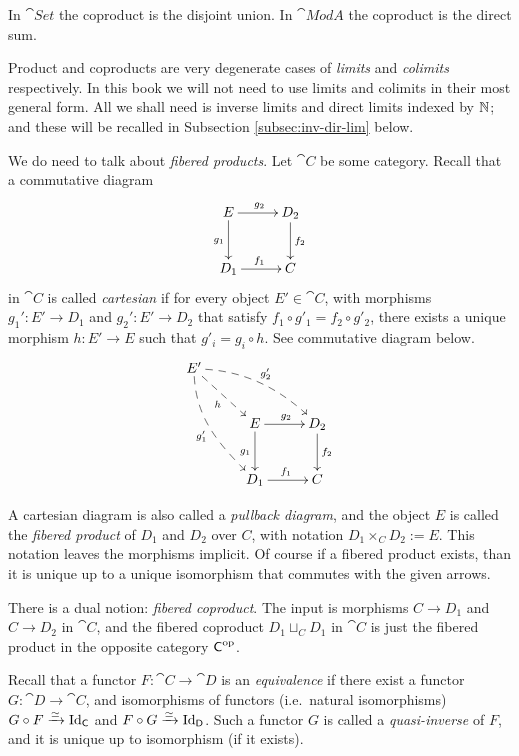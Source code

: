 \begin{exa} \label{exa:103}
In $\cat{Set}$ the coproduct is the disjoint union. 
In $\cat{Mod} A$ the coproduct is the direct sum. 
\end{exa}

Product and coproducts are very degenerate cases of {\em limits} and {\em 
colimits} respectively. In this book we will not need to use limits and 
colimits in their most general form. All we shall need is inverse limits and 
direct limits indexed by $\mathbb{N}$; and these will be recalled in Subsection 
\ref{subsec:inv-dir-lim} below. 

We do need to talk about {\em fibered products}. Let $\cat{C}$ be some 
category. Recall that a commutative diagram 
\begin{equation} \label{eqn:3625}
\UseTips \xymatrix @C=6ex @R=6ex {
E
\ar[d]_{g_1}
\ar[r]^{g_2}
&
D_2
\ar[d]^{f_2}
\\
D_1
\ar[r]^{f_1}
&
C
}
\end{equation}
in $\cat{C}$ is called {\em cartesian} if for every object $E' \in \cat{C}$, 
with morphisms 
$g_1' : E' \to D_1$ and $g_2' : E' \to D_2$ that satisfy 
$f_1 \circ g'_1 = f_2 \circ g'_2$, there exists a unique morphism 
$h : E' \to E$ such that 
$g'_i = g_i \circ h$.
See commutative diagram below. 
\[ \UseTips \xymatrix @C=6ex @R=6ex {
E'
\ar@{-->}@(d,ul)[ddr]_{g'_1}
\ar@{-->}@(r,ul)[drr]^{g'_2}
\ar@{-->}[dr]_{h}
\\
&
E
\ar[d]_{g_1}
\ar[r]^{g_2}
&
D_2
\ar[d]^{f_2}
\\
&
D_1
\ar[r]^{f_1}
&
C
} \]

A cartesian diagram is also called a {\em pullback diagram}, and the object $E$ 
is called the {\em fibered product} of $D_1$ and $D_2$ over $C$, with notation
$D_1 \times_C D_2 := E$.
This notation leaves the morphisms implicit. Of course if a fibered product 
exists, than it is unique up to a unique isomorphism that commutes with the 
given arrows. 

There is a dual notion: {\em fibered coproduct}. The input is morphisms 
$C \to D_1$ and $C \to D_2$ in $\cat{C}$, and the fibered coproduct 
$D_1 \sqcup_{C} D_1$ in $\cat{C}$ is just the fibered product in 
the opposite category $\operatorname{\mathsf{C}}^{\mathrm{op}}$.



Recall that a functor $F : \cat{C} \to \cat{D}$ is an {\em equivalence} if
there exist a functor $G : \cat{D} \to \cat{C}$, and isomorphisms of 
functors (i.e.\ natural isomorphisms)
$G \circ F \xrightarrow{\simeq} \operatorname{Id}_{\operatorname{\mathsf{C}}}$ and 
$F \circ G \xrightarrow{\simeq}  \operatorname{Id}_{\operatorname{\mathsf{D}}}$. Such a functor $G$ is called a {\em
quasi-inverse} of $F$, and it is unique up to isomorphism (if it exists).  

